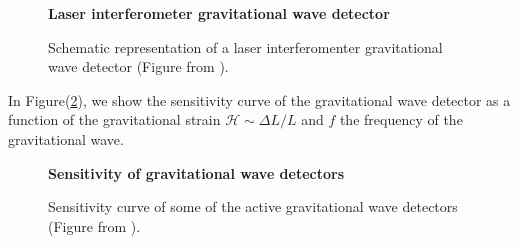 \begin{figure}[H]
\centering
    \textbf{Laser interferometer gravitational wave detector}\par\medskip
{}
\caption{Schematic representation of a laser interferomenter gravitational wave detector (Figure from \cite{LIGOLaserInterferometer1992}).}
\label{interferometer}
\end{figure}
In Figure(\ref{gw_detetctor}), we show the sensitivity curve of the gravitational wave detector as a function of the gravitational strain $\mathcal{H} \sim\Delta L / L$ and $f$ the frequency of the gravitational wave. 
\begin{figure}[H]
\centering
    \textbf{Sensitivity of gravitational wave detectors}\par\medskip
{}
\caption{Sensitivity curve of some of the active gravitational wave detectors (Figure from \cite{mooreGravitationalwaveSensitivityCurves2015}).}

\label{gw_detetctor}
\end{figure}


